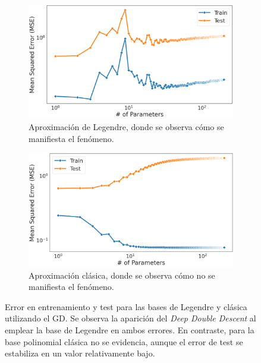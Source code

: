 \begin{figure}[h]
    \centering
    \begin{subfigure}[b]{0.48\textwidth}
        \centering
        \includegraphics[width=\textwidth]{img/experiments/LegendreFeaturesGD_DDD.png}
        \caption{Aproximación de Legendre, donde se observa cómo se manifiesta el fenómeno.}\label{fig:LegendreFeaturesGD_DDD}
    \end{subfigure}
    \hfill
    \begin{subfigure}[b]{0.48\textwidth}
        \centering
        \includegraphics[width=\textwidth]{img/experiments/PolyFeaturesGD_DDD.png}
        \caption{Aproximación clásica, donde se observa cómo no se manifiesta el fenómeno.}\label{fig:PolyFeaturesGD_DDD}
    \end{subfigure}
    \caption[Error en entrenamiento y test para las bases de Legendre y clásica utilizando el GD.]{Error en entrenamiento y test para las bases de Legendre y clásica utilizando el GD. Se observa la aparición del \textit{Deep Double Descent} al emplear la base de Legendre en ambos errores. En contraste, para la base polinomial clásica no se evidencia, aunque el error de test se estabiliza en un valor relativamente bajo.}\label{fig:aproximaciones-gd}
\end{figure}

